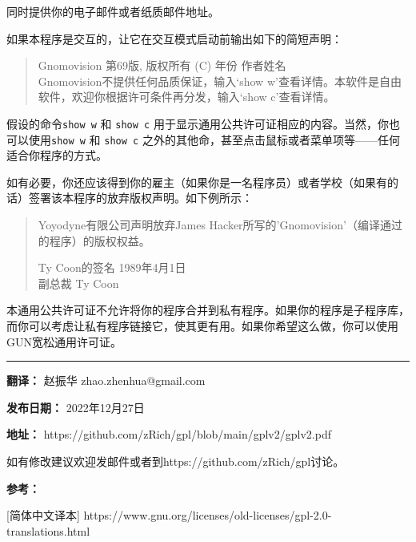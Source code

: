 \documentclass[11pt]{article}
\begin{document}
同时提供你的电子邮件或者纸质邮件地址。

如果本程序是交互的，让它在交互模式启动前输出如下的简短声明：


\begin{quote}
Gnomovision 第69版, 版权所有 (C) 年份  作者姓名 \\
Gnomovision不提供任何品质保证，输入`show w'查看详情。本软件是自由软件，欢迎你根据许可条件再分发，输入`show c'查看详情。
\end{quote}

假设的命令{\tt show w} 和 {\tt show c} 用于显示通用公共许可证相应的内容。当然，你也可以使用{\tt show w} 和 {\tt show c}
之外的其他命，甚至点击鼠标或者菜单项等——任何适合你程序的方式。

如有必要，你还应该得到你的雇主（如果你是一名程序员）或者学校（如果有的话）签署该本程序的放弃版权声明。如下例所示：

\begin{quote}
  Yoyodyne有限公司声明放弃James Hacker所写的'Gnomovision'（编译通过的程序）的版权权益。


  Ty Coon的签名 1989年4月1日 \\
  副总裁 Ty Coon
\end{quote}

本通用公共许可证不允许将你的程序合并到私有程序。如果你的程序是子程序库，而你可以考虑让私有程序链接它，使其更有用。如果你希望这么做，你可以使用GUN宽松通用许可证。

\noindent\rule{12cm}{0.4pt}

\textbf{翻译：} 赵振华 zhao.zhenhua@gmail.com

\textbf{发布日期：} 2022年12月27日

\textbf{地址：} https://github.com/zRich/gpl/blob/main/gplv2/gplv2.pdf

如有修改建议欢迎发邮件或者到https://github.com/zRich/gpl讨论。

\textbf{参考：} 

[简体中文译本] https://www.gnu.org/licenses/old-licenses/gpl-2.0-translations.html
\end{document}
